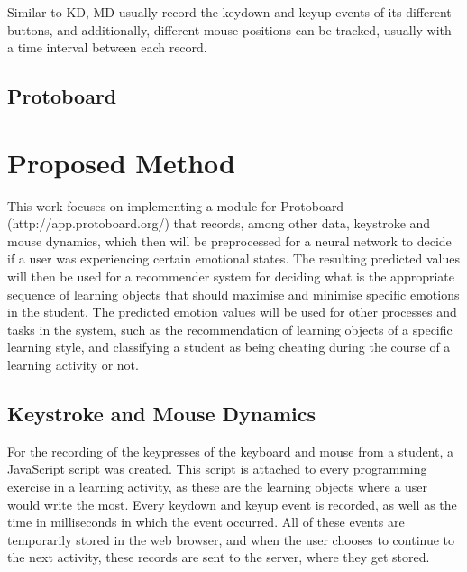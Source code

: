 \documentclass{acm_proc_article-sp}
\begin{document}
Similar to KD, MD usually record the keydown and keyup events of its
different buttons, and additionally, different mouse positions can be
tracked, usually with a time interval between each record.


\subsection{Protoboard}


\section{Proposed Method}

This work focuses on implementing a module for Protoboard (http://app.protoboard.org/) that
records, among other data, keystroke and mouse dynamics, which then
will be preprocessed for a neural network to decide if a user was
experiencing certain emotional states. The resulting predicted values
will then be used for a recommender system for deciding what is the
appropriate sequence of learning objects that should maximise and
minimise specific emotions in the student. The predicted emotion
values will be used for other processes and tasks in the system, such
as the recommendation of learning objects of a specific learning
style, and classifying a student as being cheating during the course
of a learning activity or not.


\subsection{Keystroke and Mouse Dynamics}

For the recording of the keypresses of the keyboard and mouse from a
student, a JavaScript script was created. This script is attached to
every programming exercise in a learning activity, as these are the
learning objects where a user would write the most. Every keydown and
keyup event is recorded, as well as the time in milliseconds in which the event
occurred. All of these events are temporarily stored in the web
browser, and when the user chooses to continue to the next activity,
these records are sent to the server, where they get stored.




\balancecolumns
\end{document}

